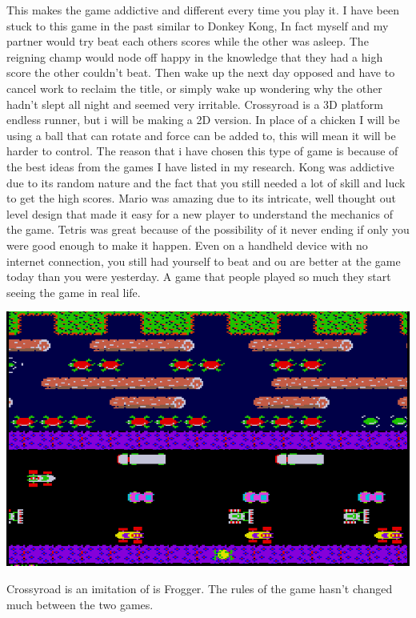 \documentclass{article}
\begin{document}
This makes the game addictive and different every time you play it. I have been stuck to this game in the past similar to Donkey Kong, In fact myself and my partner would try beat each others scores while the other was asleep. The reigning champ would node off happy in the knowledge that they had a high score the other couldn't beat. Then wake up the next day opposed and have to cancel work to reclaim the title, or simply wake up wondering why the other hadn't slept all night and seemed very irritable. \newline
Crossyroad is a 3D platform endless runner, but i will be making a 2D version. In place of a chicken I will be using a ball that can rotate and force can be added to, this will mean it will be harder to control. The reason that i have chosen this type of game is because of the best ideas from the games I have listed in my research. Kong was addictive due to its random nature and the fact that you still needed a lot of skill and luck to get the high scores. Mario was amazing due to its intricate, well thought out level design that made it easy for a new player to understand the mechanics of the game. Tetris was great because of the possibility of it never ending if only you were good enough to make it happen. Even on a handheld device with no internet connection, you still had yourself to beat and ou are better at the game today than you were yesterday. A game that people played so much they start seeing the game in real life. \newline

\begin{minipage}{0.35\textwidth}
\includegraphics[width=\linewidth]{frogger}
\end{minipage} \hfill
\begin{minipage}{0.55\textwidth}\raggedright
Crossyroad is an imitation of is Frogger. The rules of the game hasn't changed much between the two games.
\end{minipage} \newline
\end{document}
